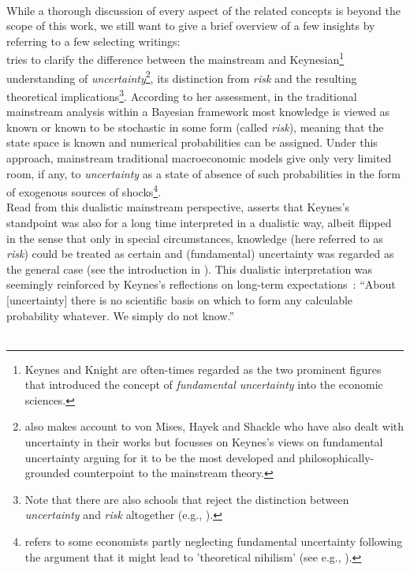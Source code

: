 \documentclass[a4paper,11pt,listof=nochaptergap,oneside,pointednumbers,bibtotoc,bigheadings,liststotoc]{scrbook}
\theoremstyle{mysatz}
\theoremstyle{mydefinition}
\theoremstyle{mybemerkung}
\newcommand{\forceindent}{\leavevmode{\parindent=1em\indent}}
\begin{document}
\\
While a thorough discussion of every aspect of the related concepts is beyond the scope of this work, we still want to give a brief overview of a few insights by referring to a few selecting writings:\\
\forceindent \citet{dow:16} tries to clarify the difference between the mainstream and Keynesian\footnote{Keynes and Knight are often-times regarded as the two prominent figures that introduced the concept of \textit{fundamental uncertainty} into the economic sciences.} understanding of \textit{uncertainty}\footnote{\citet{dow:16} also makes account to von Mises, Hayek and Shackle who have also dealt with uncertainty in their works but focusses on Keynes's views on fundamental uncertainty arguing for it to be the most developed and philosophically-grounded counterpoint to the mainstream theory.}, its distinction from \textit{risk} and the resulting theoretical implications\footnote{Note that there are also schools that reject the distinction between \textit{uncertainty} and \textit{risk} altogether (e.g., \citealp{savage:54}).}. According to her assessment, in the traditional mainstream analysis within a Bayesian framework most knowledge is viewed as known or known to be stochastic in some form (called \textit{risk}), meaning that the state space is known and numerical probabilities can be assigned. Under this approach, mainstream traditional macroeconomic models give only very limited room, if any, to \textit{uncertainty} as a state of absence of such probabilities in the form of exogenous sources of shocks\footnote{\citet[p. 43]{dequesh:00} refers to some economists partly neglecting fundamental uncertainty following the argument that it might lead to 'theoretical nihilism' (see e.g., \citealp{coddington:82}).}. \\
Read from this dualistic mainstream perspective, \citet{dow:16} asserts that Keynes's standpoint was also for a long time interpreted in a dualistic way, albeit flipped in the sense that only in special circumstances, knowledge (here referred to as \textit{risk}) could be treated as certain and (fundamental) uncertainty was regarded as the general case (see the introduction in \citealp{keynes:21}). This dualistic interpretation was seemingly reinforced by Keynes's reflections on long-term expectations~\citep[p. 214/214]{keynes:37}: 
``About [uncertainty] there is no scientific basis on which to form any calculable probability whatever. We simply do not know.''\\
\\
\end{document}
